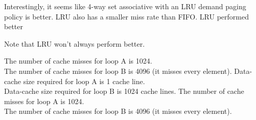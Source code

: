 \documentclass[11pt]{article}
\begin{document}
\begin{Parts}
	Interestingly, it seems like 4-way set associative with an LRU demand paging policy is better. LRU also has a smaller miss rate than FIFO. LRU performed better 
	
	Note that LRU won't always perform better. 
\end{Parts}
\newpage


\begin{Parts}
	\Part
		The number of cache misses for loop A is 1024. \\
		The number of cache misses for loop B is 4096 (it misses every element).
	\Part
		Data-cache size required for loop A is 1 cache line. \\
		Data-cache size required for loop B is 1024 cache lines.
	\Part
		The number of cache misses for loop A is 1024. \\
		The number of cache misses for loop B is 4096 (it misses every element).
\end{Parts}
\newpage

\end{document}
